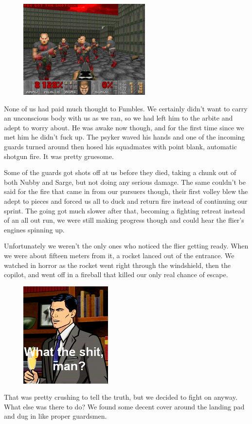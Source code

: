 \begin{figure}
	\begin{center}
		\includegraphics[width=\figwidth]{pics/9/39.png}
	\end{center}
\end{figure}
None of us had paid much thought to Fumbles. 
We certainly didn't want to carry an unconscious body with us as we ran, so we had left him to the arbite and adept to worry about. 
He was awake now though, and for the first time since we met him he didn't fuck up. 
The psyker waved his hands and one of the incoming guards turned around then hosed his squadmates with point blank, automatic shotgun fire. 
It was pretty gruesome.

Some of the guards got shots off at us before they died, taking a chunk out of both Nubby and Sarge, but not doing any serious damage. 
The same couldn't be said for the fire that came in from our pursuers though, their first volley blew the adept to pieces and forced us all to duck and return fire instead of continuing our sprint. 
The going got much slower after that, becoming a fighting retreat instead of an all out run, we were still making progress though and could hear the flier's engines spinning up. 


Unfortunately we weren't the only ones who noticed the flier getting ready. 
When we were about fifteen meters from it, a rocket lanced out of the entrance. 
We watched in horror as the rocket went right through the windshield, then the copilot, and went off in a fireball that killed our only real chance of escape.

\begin{figure}
	\begin{center}
		\includegraphics[width=\figwidth]{pics/9/40.png}
	\end{center}
\end{figure}
That was pretty crushing to tell the truth, but we decided to fight on anyway. 
What else was there to do? 
We found some decent cover around the landing pad and dug in like proper guardsmen.

